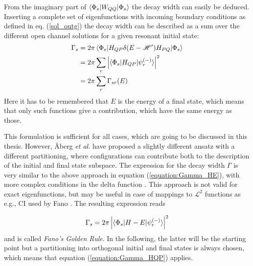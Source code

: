 

From the imaginary part of $\braket{\Phi_s|W_{QQ}|\Phi_s}$ the decay width can
easily be deduced. Inserting a complete set
of eigenfunctions with incoming boundary conditions as defined in
eq. (\ref{sol_outg}) the decay width can be described
as a sum over the different open channel solutions for a given resonant
initial state:
\begin{align}
  \Gamma_s & = 2 \pi \braket{\Phi_s|H_{QP}\delta(E - \mathscr{H}')H_{PQ}|\Phi_s}
               \label{equation:Gamma_HE}\\
           & = 2 \pi \sum\limits_r \left | \braket{\Phi_s|H_{QP}|\psi_r^{(-)}} \right|^2
                 \label{equation:Gamma_HQP}\\
           & = 2 \pi \sum\limits_r \Gamma_{sr}(E)
\end{align}
Here it has to be remembered that $E$ is the energy of a final state, which means that
only such functions give a contribution, which have the same energy as those.

This formulation is sufficient for all cases, which are going to be discussed
in this thesis.
However, {\AA}berg \textit{et al.} have proposed a slightly different ansatz with
a different partitioning, where configurations can contribute both to the description
of the initial and final state subspace. The expression for the decay width $\Gamma$
is very similar to the above approach in equation (\ref{equation:Gamma_HE}), with more
complex conditions in the delta function \cite{Aaberg82}.
This approach is not valid for exact
eigenfunctions, but may be useful in case of mappings to $\mathcal{L}^2$ functions as
e.g., \ac{CI} used by Fano \cite{Fano61}. The resulting expression reads

\begin{equation}
  \Gamma_s = 2 \pi \left| \braket{\Phi_s|H-E|\psi_r^{(-)}} \right| ^2
\end{equation}
and is called \emph{Fano's Golden Rule}. In the following, the latter will be
the starting point
but a partitioning into orthogonal initial and final
states is always chosen, which means that
equation (\ref{equation:Gamma_HQP}) applies.
